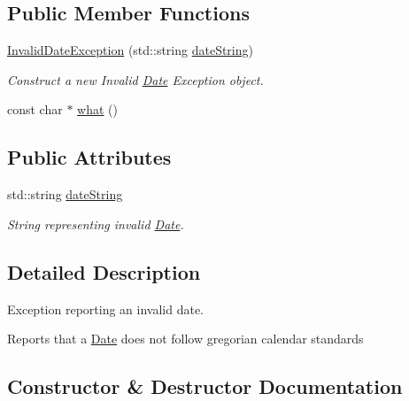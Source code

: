 \subsection*{Public Member Functions}
\begin{DoxyCompactItemize}
\item 
\mbox{\hyperlink{classInvalidDateException_a0ae7a8a97c0442fc025cb63e3b86bee8}{Invalid\+Date\+Exception}} (std\+::string \mbox{\hyperlink{classInvalidDateException_a70664a8f1fe8853eed11199c5c0f0060}{date\+String}})
\begin{DoxyCompactList}\small\item\em Construct a new Invalid \mbox{\hyperlink{classDate}{Date}} Exception object. \end{DoxyCompactList}\item 
const char $\ast$ \mbox{\hyperlink{classInvalidDateException_af56c21dd2acc97de665ab5cb62daf6ad}{what}} ()
\end{DoxyCompactItemize}
\subsection*{Public Attributes}
\begin{DoxyCompactItemize}
\item 
std\+::string \mbox{\hyperlink{classInvalidDateException_a70664a8f1fe8853eed11199c5c0f0060}{date\+String}}
\begin{DoxyCompactList}\small\item\em String representing invalid \mbox{\hyperlink{classDate}{Date}}. \end{DoxyCompactList}\end{DoxyCompactItemize}


\subsection{Detailed Description}
Exception reporting an invalid date. 

Reports that a \mbox{\hyperlink{classDate}{Date}} does not follow gregorian calendar standards 

\subsection{Constructor \& Destructor Documentation}
\mbox{\label{classInvalidDateException_a0ae7a8a97c0442fc025cb63e3b86bee8}} 
